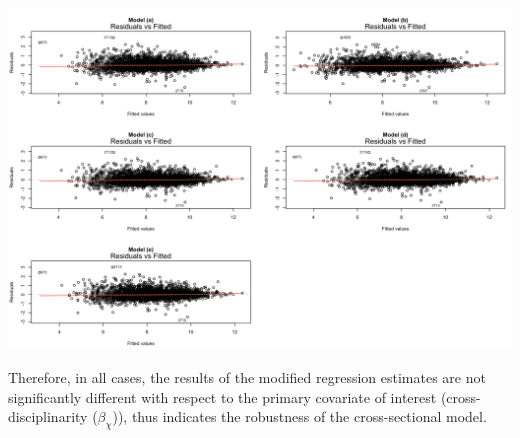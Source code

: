 \documentclass{article}\usepackage[]{graphicx}\usepackage[]{color}
\begin{document}
\begin{description}
    \begin{center}
    \includegraphics[scale=0.33]{ResidualPlots_TableS3.png}
    \end{center}
  \item Therefore, in all cases, the results of the modified regression estimates are not significantly different with respect to the primary covariate of interest (cross-disciplinarity ($\beta_{\chi}$)), thus indicates the robustness of the cross-sectional model.
\end{description}
\end{document}
